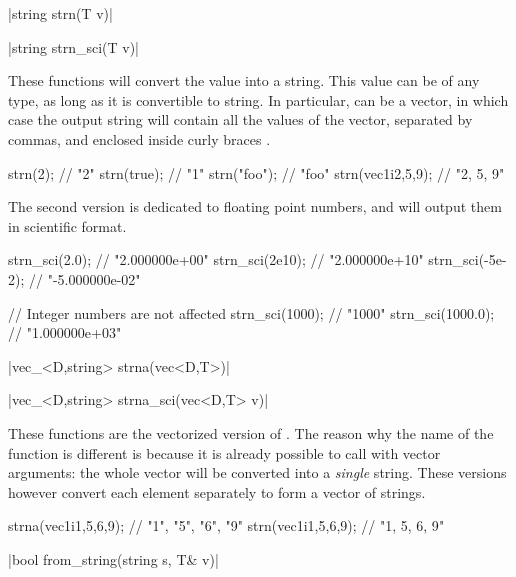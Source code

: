 \funcitem \cppinline|string strn(T v)| 

\cppinline|string strn_sci(T v)| 

These functions will convert the value  into a string. This value can be of any type, as long as it is convertible to string. In particular,  can be a vector, in which case the output string will contain all the values of the vector, separated by commas, and enclosed inside curly braces .

\begin{example}
\begin{cppcode}
strn(2);            // "2"
strn(true);         // "1"
strn("foo");        // "foo"
strn(vec1i{2,5,9}); // "{2, 5, 9}"
\end{cppcode}
\end{example}

The second version is dedicated to floating point numbers, and will output them in scientific format.

\begin{example}
\begin{cppcode}
strn_sci(2.0);    // "2.000000e+00"
strn_sci(2e10);   // "2.000000e+10"
strn_sci(-5e-2);  // "-5.000000e-02"

// Integer numbers are not affected
strn_sci(1000);   // "1000"
strn_sci(1000.0); // "1.000000e+03"
\end{cppcode}
\end{example}

\funcitem \cppinline|vec_<D,string> strna(vec<D,T>)| 

\cppinline|vec_<D,string> strna_sci(vec<D,T> v)| 

These functions are the vectorized version of . The reason why the name of the function is different is because it is already possible to call  with vector arguments: the whole vector will be converted into a \emph{single} string. These versions however convert each element separately to form a vector of strings.

\begin{example}
\begin{cppcode}
strna(vec1i{1,5,6,9}); // {"1", "5", "6", "9"}
strn(vec1i{1,5,6,9});  // "{1, 5, 6, 9}"
\end{cppcode}
\end{example}

\funcitem \vectorfunc \cppinline|bool from_string(string s, T& v)| 

